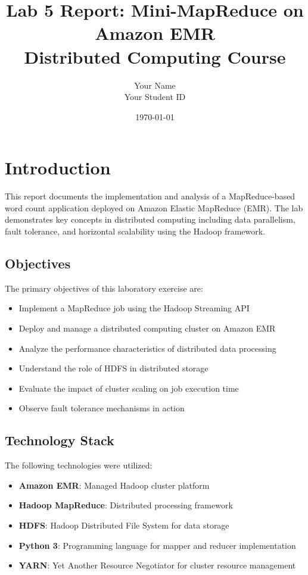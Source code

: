 \documentclass[11pt,a4paper]{article}
\title{\textbf{Lab 5 Report: Mini-MapReduce on Amazon EMR} \\
\large Distributed Computing Course}
\author{Your Name \\ Your Student ID}
\date{\today}
\begin{document}
\maketitle
\tableofcontents
\newpage

\section{Introduction}

This report documents the implementation and analysis of a MapReduce-based word count application deployed on Amazon Elastic MapReduce (EMR). The lab demonstrates key concepts in distributed computing including data parallelism, fault tolerance, and horizontal scalability using the Hadoop framework.

\subsection{Objectives}

The primary objectives of this laboratory exercise are:

\begin{itemize}
    \item Implement a MapReduce job using the Hadoop Streaming API
    \item Deploy and manage a distributed computing cluster on Amazon EMR
    \item Analyze the performance characteristics of distributed data processing
    \item Understand the role of HDFS in distributed storage
    \item Evaluate the impact of cluster scaling on job execution time
    \item Observe fault tolerance mechanisms in action
\end{itemize}

\subsection{Technology Stack}

The following technologies were utilized:

\begin{itemize}
    \item \textbf{Amazon EMR}: Managed Hadoop cluster platform
    \item \textbf{Hadoop MapReduce}: Distributed processing framework
    \item \textbf{HDFS}: Hadoop Distributed File System for data storage
    \item \textbf{Python 3}: Programming language for mapper and reducer implementation
    \item \textbf{YARN}: Yet Another Resource Negotiator for cluster resource management
\end{itemize}
\end{document}
